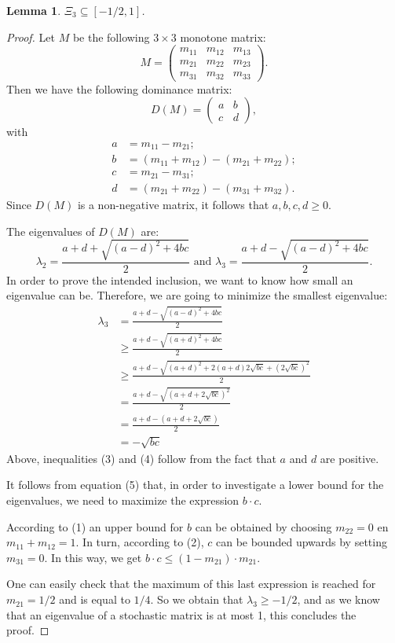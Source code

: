 \documentclass[11pt,a4paper]{article}
\newtheorem{lemma}[theorem]{Lemma}
\theoremstyle{definition}
\theoremstyle{remark}
\begin{document}
\begin{lemma}\label{lemmainclusie}
    \(\Xi_3 \subseteq [-1/2, 1]\).
\end{lemma}
\begin{proof}
    Let \(M\) be the following \(3 \times 3\) monotone matrix:
    \[M = \begin{pmatrix}
        m_{11} & m_{12} & m_{13} \\
        m_{21} & m_{22} & m_{23} \\
        m_{31} & m_{32} & m_{33}
    \end{pmatrix} .\]
   Then we have the following dominance matrix:
\[
D(M) = \begin{pmatrix}
    a & b \\
    c & d
\end{pmatrix},
\]
with 
\begin{align}
    a &= m_{11} - m_{21}; \nonumber \\
    b &= (m_{11} + m_{12}) - (m_{21} + m_{22}); \\
    c &= m_{21} - m_{31}; \\
    d &= (m_{21} + m_{22}) - (m_{31} + m_{32}). \nonumber
\end{align}
Since \(D(M)\) is a non-negative matrix, it follows that \(a, b, c, d \geq 0\).

    The eigenvalues of \(D(M)\) are:
    \[ \lambda_2 = \frac{a + d + \sqrt{(a-d)^2 + 4bc}}{2} \text{ and } \lambda_3 = \frac{a + d - \sqrt{(a-d)^2 + 4bc}}{2} .\]
    In order to prove the intended inclusion, we want to know how small an eigenvalue can be. Therefore, we are going to minimize the smallest eigenvalue:
    \begin{align}
        \lambda_3 &= \frac{a + d - \sqrt{(a-d)^2 + 4bc}}{2} \nonumber \\
         &\geqslant \frac{a + d - \sqrt{(a+d)^2 + 4bc}}{2} \\
         &\geqslant \frac{a + d - \sqrt{(a+d)^2 + 2(a+d)2\sqrt{bc} + (2\sqrt{bc})^2}}{2} \\
         &= \frac{a + d - \sqrt{(a+d + 2 \sqrt{bc})^2}}{2} \nonumber \\
         &= \frac{a + d - (a+d + 2 \sqrt{bc})}{2} \nonumber\\
         &= - \sqrt{bc}
    \end{align}
    Above, inequalities (3) and (4) follow from the fact that \(a\) and \(d\) are positive.

    It follows from equation (5) that, in order to investigate a lower bound for the eigenvalues, we need to maximize the expression \(b \cdot c\).
    
    According to (1) an upper bound for \(b\) can be obtained by choosing \(m_{22} = 0\) en \(m_{11} + m_{12} = 1\). In turn, according to (2), \(c\) can be bounded upwards by setting \(m_{31} = 0\). In this way, we get \( b \cdot c \leq (1-m_{21}) \cdot m_{21}.\)

    One can easily check that the maximum of this last expression is reached for \(m_{21}=1/2\) and is equal to \(1/4\). So we obtain that \( \lambda_3 \geqslant - 1/2 \), and as we know that an eigenvalue of a stochastic matrix is at most 1, this concludes the proof.
\end{proof}
\end{document}
